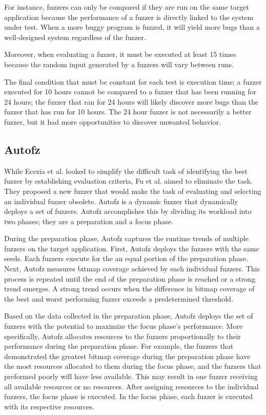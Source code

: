For instance, fuzzers can only be compared if they are run on the same target application because the performance of a fuzzer is directly linked to the system under test. When a more buggy program is fuzzed, it will yield more bugs than a well-designed system regardless of the fuzzer. 

Moreover, when evaluating a fuzzer, it must be executed at least 15 times because the random input generated by a fuzzers will vary between runs.

The final condition that must be constant for each test is execution time; a fuzzer executed for 10 hours cannot be compared to a fuzzer that has been running for 24 hours; the fuzzer that ran for 24 hours will likely discover more bugs than the fuzzer that has run for 10 hours. The 24 hour fuzzer is not necessarily a better fuzzer, but it had more opportunities to discover unwanted behavior. \cite{Ecezia}

\subsection{Autofz}
While Ecezia et al. looked to simplify the difficult task of identifying the best fuzzer by establishing evaluation criteria, Fu et al. aimed to eliminate the task. They proposed a new fuzzer that would make the task of evaluating and selecting an individual fuzzer obsolete. Autofz is a dynamic fuzzer that dynamically deploys a set of fuzzers. Autofz accomplishes this by dividing its workload into two phases; they are a preparation and a focus phase.

During the preparation phase, Autofz captures the runtime trends of multiple fuzzers on the target application. First, Autofz deploys the fuzzers with the same seeds. Each fuzzers execute for the an equal portion of the preparation phase. Next, Autofz measures bitmap coverage achieved by each individual fuzzers. This process is repeated until the end of the preparation phase is reached or a strong trend emerges. A strong trend occurs when the difference in bitmap coverage of the best and worst performing fuzzer exceeds a predetermined threshold.

Based on the data collected in the preparation phase, Autofz deploys the set of fuzzers with the potential to maximize the focus phase’s performance. More specifically, Autofz allocates resources to the fuzzers proportionally to their performance during the preparation phase. For example, the fuzzers that demonstrated the greatest bitmap coverage during the preparation phase have the most resources allocated to them during the focus phase, and the fuzzers that preformed poorly will have less available. This may result in one fuzzer receiving all available resources or no resources. After assigning resources to the individual fuzzers, the focus phase is executed. In the focus phase, each fuzzer is executed with its respective resources.

